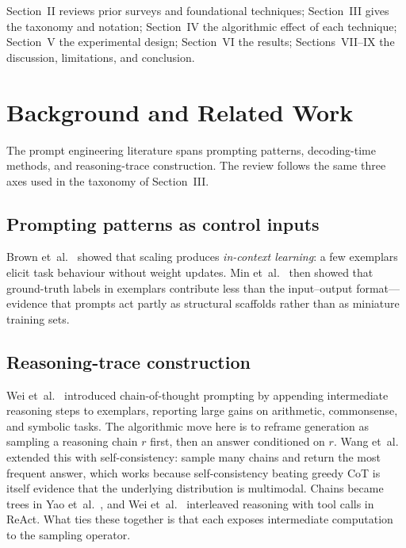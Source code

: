 \documentclass[conference]{IEEEtran}
\begin{document}
Section~II reviews prior surveys and foundational techniques;
Section~III gives the taxonomy and notation; Section~IV the
algorithmic effect of each technique; Section~V the experimental
design; Section~VI the results; Sections~VII--IX the discussion,
limitations, and conclusion.


\section{Background and Related Work}
\label{sec:related}

The prompt engineering literature spans prompting patterns,
decoding-time methods, and reasoning-trace construction.  The review
follows the same three axes used in the taxonomy of Section~III.

\subsection{Prompting patterns as control inputs}

Brown et~al.~\cite{b1} showed that scaling produces \emph{in-context
learning}: a few exemplars elicit task behaviour without weight
updates.  Min et~al.~\cite{b2} then showed that ground-truth labels in
exemplars contribute less than the input--output format---evidence
that prompts act partly as structural scaffolds rather than as
miniature training sets.

\subsection{Reasoning-trace construction}

Wei et~al.~\cite{b3} introduced chain-of-thought prompting by
appending intermediate reasoning steps to exemplars, reporting large
gains on arithmetic, commonsense, and symbolic tasks.  The algorithmic
move here is to reframe generation as sampling a reasoning chain $r$
first, then an answer conditioned on $r$.  Wang et~al.~\cite{b4}
extended this with self-consistency: sample many chains and return
the most frequent answer, which works because self-consistency
beating greedy CoT is itself evidence that the underlying distribution
is multimodal.  Chains became trees in Yao et~al.~\cite{b5}, and Wei
et~al.~\cite{b6} interleaved reasoning with tool calls in ReAct.  What
ties these together is that each exposes intermediate computation to
the sampling operator.
\end{document}
